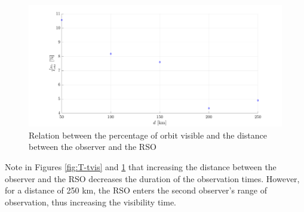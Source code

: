 \begin{figure}[H]
    \centering
    \includegraphics[width=\textwidth]{Figures/percentage-orbit.png}
    \caption{Relation between the percentage of orbit visible and the distance between the observer and the RSO}
    \label{fig:percentages}
\end{figure}

Note in Figures \ref{fig:T-tvis} and \ref{fig:percentages} that increasing the distance between the observer and the RSO decreases the duration of the observation times. However, for a distance of 250 km, the RSO enters the second observer's range of observation, thus increasing the visibility time.



